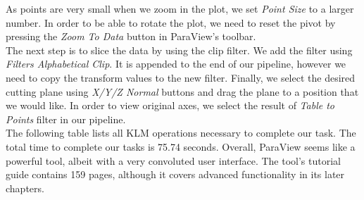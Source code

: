 \documentclass{article}
\begin{document}
As points are very small when we zoom in the plot, we set \emph{Point Size} to a larger number. In order to be able to rotate the plot, we need to reset the pivot by pressing the \emph{Zoom To Data} button in ParaView's toolbar.\\

The next step is to slice the data by using the clip filter. We add the filter using \emph{Filters \textrightarrow{} Alphabetical \textrightarrow{} Clip}. It is appended to the end of our pipeline, however we need to copy the transform values to the new filter. Finally, we select the desired cutting plane using \emph{X/Y/Z Normal} buttons and drag the plane to a position that we would like. In order to view original axes, we select the result of \emph{Table to Points} filter in our pipeline.\\

The following table lists all KLM operations necessary to complete our task. The total time to complete our tasks is 75.74 seconds. Overall, ParaView seems like a powerful tool, albeit with a very convoluted user interface. The tool's tutorial guide contains 159 pages, although it covers advanced functionality in its later chapters.\\
\end{document}
